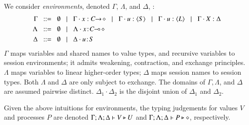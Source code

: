 \documentclass[preprint,11pt]{elsarticle}
\begin{document}
{%
We consider 
\emph{environments}, denoted $\Gamma$, $\Lambda$, and $\Delta$, :
\begin{align*}
		\Gamma  & \bnfis  \emptyset \bnfbar \Gamma \cat \varp{x}: \shot{C} \bnfbar \Gamma \cat u: \chtype{S} \bnfbar \Gamma \cat u: \chtype{L} 
		\bnfbar \Gamma \cat \rvar{X}: \Delta
\\
		\Lambda & \bnfis  \emptyset \bnfbar \Lambda \cat \AT{x}{\lhot{C}}
		 \\
		\Delta   & \bnfis   \emptyset \bnfbar \Delta \cat \AT{u}{S}
\end{align*}
$\Gamma$ maps variables and shared names to value types, and recursive 
variables to session environments; %
it admits weakening, contraction, and exchange principles.
$\Lambda$ maps variables to 
linear
higher-order
types;   $\Delta$  maps   
session names to session types. 
Both $\Lambda$ and $\Delta$
are
only subject to exchange.  
The domains of $\Gamma,
\Lambda$, and $\Delta$ are assumed pairwise distinct. 
$\Delta_1\cdot \Delta_2$ is the disjoint union of $\Delta_1$ and $\Delta_2$.  

Given the above intuitions for environments, 
the typing judgements for values $V$ and processes $P$ are denoted 
$\Gamma; \Lambda; \Delta \vdash V \triangleright U$ and $\Gamma; \Lambda; \Delta \vdash P \triangleright \diamond$, respectively.
%
 



}
\end{document}

